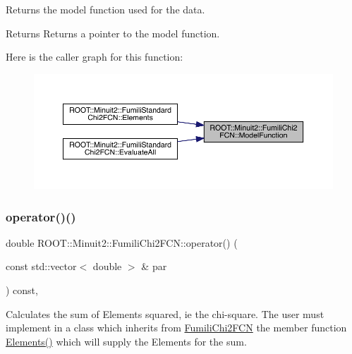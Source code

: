 Returns the model function used for the data.

\begin{DoxyReturn}{Returns}
Returns a pointer to the model function. 
\end{DoxyReturn}
Here is the caller graph for this function\+:
\nopagebreak
\begin{figure}[H]
\begin{center}
\leavevmode
\includegraphics[width=350pt]{d3/df0/classROOT_1_1Minuit2_1_1FumiliChi2FCN_a3d31739e476a413e0c5616bb0c6283b9_icgraph}
\end{center}
\end{figure}
\mbox{\label{classROOT_1_1Minuit2_1_1FumiliChi2FCN_ae7b2c2080162c0b946cf54090b712716}} 
\subsubsection{\texorpdfstring{operator()()}{operator()()}\hspace{0.1cm}{\footnotesize\ttfamily [1/3]}}
{\footnotesize\ttfamily double R\+O\+O\+T\+::\+Minuit2\+::\+Fumili\+Chi2\+F\+C\+N\+::operator() (\begin{DoxyParamCaption}\item[{const std\+::vector$<$ double $>$ \&}]{par }\end{DoxyParamCaption}) const\hspace{0.3cm}{\ttfamily [inline]}, {\ttfamily [virtual]}}

Calculates the sum of Elements squared, ie the chi-\/square. The user must implement in a class which inherits from \mbox{\hyperlink{classROOT_1_1Minuit2_1_1FumiliChi2FCN}{Fumili\+Chi2\+F\+CN}} the member function \mbox{\hyperlink{classROOT_1_1Minuit2_1_1FumiliChi2FCN_a25cc8dcc2eff831b3c0a94bf5413c2cd}{Elements()}} which will supply the Elements for the sum.


